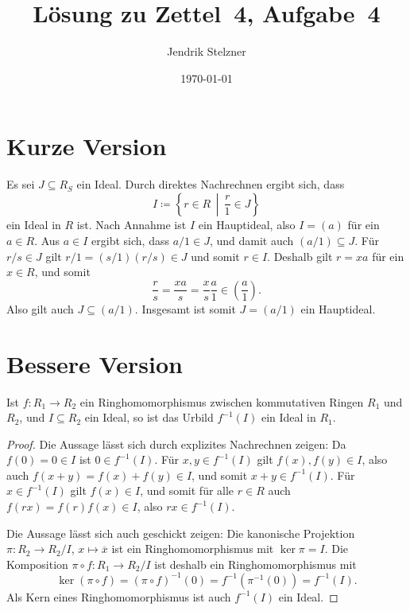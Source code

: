 \documentclass[a4paper,10pt]{scrartcl}
\title{Lösung zu Zettel~4, Aufgabe~4}
\author{Jendrik Stelzner}
\date{\today}
\begin{document}
\maketitle





\section{Kurze Version}

Es sei $J \subseteq R_S$ ein Ideal.
Durch direktes Nachrechnen ergibt sich, dass
\[
            I
  \coloneqq \left\{
              r \in R
            \,\middle|\,
              \frac{r}{1} \in J
            \right\}
\]
ein Ideal in $R$ ist.
Nach Annahme ist $I$ ein Hauptideal, also $I = (a)$ für ein $a \in R$.
Aus $a \in I$ ergibt sich, dass $a/1 \in J$, und damit auch $(a/1) \subseteq J$.
Für $r/s \in J$ gilt $r/1 = (s/1)(r/s) \in J$ und somit $r \in I$.
Deshalb gilt $r = x a$ für ein $x \in R$, und somit
\[
      \frac{r}{s}
  =   \frac{x a}{s}
  =   \frac{x}{s} \frac{a}{1}
  \in \left( \frac{a}{1} \right).
\]
Also gilt auch $J \subseteq (a/1)$.
Insgesamt ist somit $J = (a/1)$ ein Hauptideal.





\section{Bessere Version}


\begin{lemma}
  \label{lem: preimage of ideals}
  Ist $f \colon R_1 \to R_2$ ein Ringhomomorphismus zwischen kommutativen Ringen $R_1$ und $R_2$, und $I \subseteq R_2$ ein Ideal, so ist das Urbild $f^{-1}(I)$ ein Ideal in $R_1$.
\end{lemma}


\begin{proof}
  Die Aussage lässt sich durch explizites Nachrechnen zeigen:
  Da $f(0) = 0 \in I$ ist $0 \in f^{-1}(I)$.
  Für $x, y \in f^{-1}(I)$ gilt $f(x), f(y) \in I$, also auch $f(x + y) = f(x) + f(y) \in I$, und somit $x + y \in f^{-1}(I)$.
  Für $x \in f^{-1}(I)$ gilt $f(x) \in I$, und somit für alle $r \in R$ auch $f(rx) = f(r) f(x) \in I$, also $r x \in f^{-1}(I)$.
  
  Die Aussage lässt sich auch geschickt zeigen:
  Die kanonische Projektion $\pi \colon R_2 \to R_2/I$, $x \mapsto \overline{x}$ ist ein Ringhomomorphismus mit $\ker \pi = I$.
  Die Komposition $\pi \circ f \colon R_1 \to R_2/I$ ist deshalb ein Ringhomomorphismus mit
  \[
      \ker(\pi \circ f)
    = (\pi \circ f)^{-1}(0)
    = f^{-1}(\pi^{-1}(0))
    = f^{-1}(I).
  \]
  Als Kern eines Ringhomomorphismus ist auch $f^{-1}(I)$ ein Ideal.
\end{proof}
\end{document}
